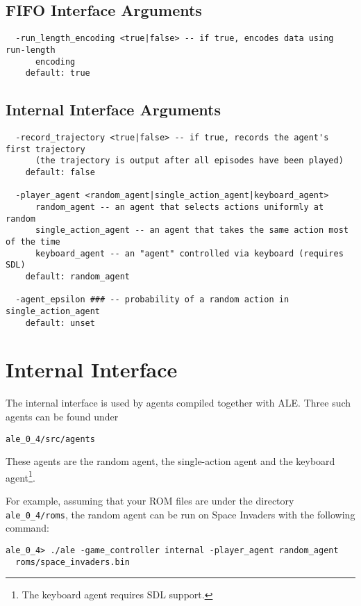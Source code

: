 \documentclass[12pt]{article}
\begin{document}
\subsection{FIFO Interface Arguments}

\small{
\begin{verbatim}
  -run_length_encoding <true|false> -- if true, encodes data using run-length
      encoding
    default: true
\end{verbatim}
}

\subsection{Internal Interface Arguments}

\small{
\begin{verbatim}
  -record_trajectory <true|false> -- if true, records the agent's first trajectory
      (the trajectory is output after all episodes have been played) 
    default: false

  -player_agent <random_agent|single_action_agent|keyboard_agent>
      random_agent -- an agent that selects actions uniformly at random
      single_action_agent -- an agent that takes the same action most of the time
      keyboard_agent -- an "agent" controlled via keyboard (requires SDL)
    default: random_agent

  -agent_epsilon ### -- probability of a random action in single_action_agent
    default: unset

\end{verbatim}
}

\section{Internal Interface}\label{sec:internal_interface}

The internal interface is used by agents compiled together with ALE. Three such agents
can be found under 

\begin{verbatim}
ale_0_4/src/agents
\end{verbatim}

These agents are the random agent, the single-action agent and the keyboard agent\footnote{The keyboard agent requires SDL support.}.

For example, assuming that your ROM files are under the directory \verb+ale_0_4/roms+, the
random agent can be run on Space Invaders with the following command:

\begin{verbatim}
ale_0_4> ./ale -game_controller internal -player_agent random_agent  
  roms/space_invaders.bin
\end{verbatim}
\end{document}
